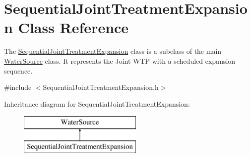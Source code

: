\hypertarget{classSequentialJointTreatmentExpansion}{}\section{Sequential\+Joint\+Treatment\+Expansion Class Reference}
\label{classSequentialJointTreatmentExpansion}


The {\ttfamily \mbox{\hyperlink{classSequentialJointTreatmentExpansion}{Sequential\+Joint\+Treatment\+Expansion}}} class is a subclass of the main {\ttfamily \mbox{\hyperlink{classWaterSource}{Water\+Source}}} class. It represents the Joint W\+TP with a scheduled expansion sequence.  




{\ttfamily \#include $<$Sequential\+Joint\+Treatment\+Expansion.\+h$>$}

Inheritance diagram for Sequential\+Joint\+Treatment\+Expansion\+:\begin{figure}[H]
\begin{center}
\leavevmode
\includegraphics[height=2.000000cm]{classSequentialJointTreatmentExpansion}
\end{center}
\end{figure}
